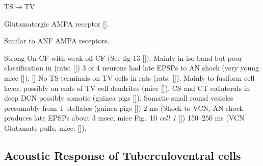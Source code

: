 TS\ensuremath{\rightarrow}TV                        

Glutamatergic AMPA receptor  [].

Similar to ANF AMPA receptors.        

Strong On-CF with weak off-CF  (See fig 13 []). 
Mainly in iso-band but poor classification in (rats: [])         
3 of 4 neurons had late EPSPs to AN shock (very young mice []).
[] 
No TS terminals on TV cells in rats (rats: []).
Mainly to fusiform cell layer, possibly on ends of TV cell dendrites (mice []). 
CS and CT collaterals in deep DCN possibly somatic (guinea pigs []).
Somatic small round vesicles presumably from T stellates  (guinea pigs [])   
2 ms (Shock to VCN, AN shock produces late EPSPs about 3 msec, mice Fig.~10 \textit{cell 1} [])
150--250 ms (VCN Glutamate puffs, mice:  []).


\subsection{Acoustic Response of Tuberculoventral cells}


